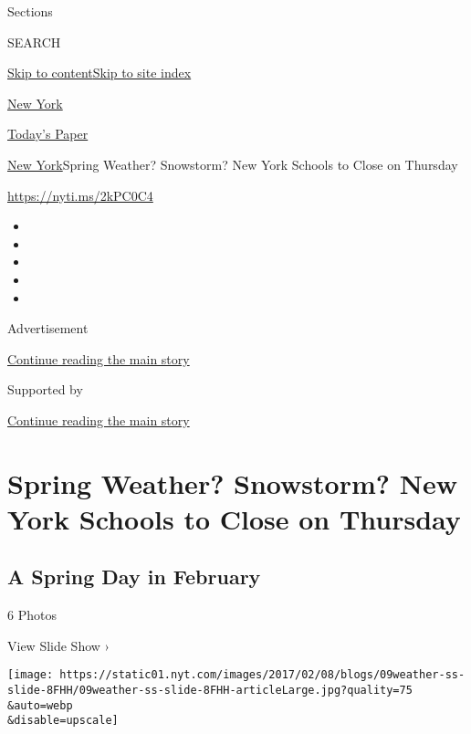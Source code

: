 Sections

SEARCH

\protect\hyperlink{site-content}{Skip to
content}\protect\hyperlink{site-index}{Skip to site index}

\href{https://www.nytimes.com/section/nyregion}{New York}

\href{https://myaccount.nytimes.com/auth/login?response_type=cookie\&client_id=vi}{}

\href{https://www.nytimes.com/section/todayspaper}{Today's Paper}

\href{/section/nyregion}{New York}\textbar{}Spring Weather? Snowstorm?
New York Schools to Close on Thursday

\url{https://nyti.ms/2kPC0C4}

\begin{itemize}
\item
\item
\item
\item
\item
\end{itemize}

Advertisement

\protect\hyperlink{after-top}{Continue reading the main story}

Supported by

\protect\hyperlink{after-sponsor}{Continue reading the main story}

\hypertarget{spring-weather-snowstorm-new-york-schools-to-close-on-thursday}{%
\section{Spring Weather? Snowstorm? New York Schools to Close on
Thursday}\label{spring-weather-snowstorm-new-york-schools-to-close-on-thursday}}

\href{https://www.nytimes.com/slideshow/2017/02/08/blogs/a-spring-day-in-february.html}{}

\hypertarget{a-spring-day-in-february}{%
\subsection{A Spring Day in February}\label{a-spring-day-in-february}}

6 Photos

View Slide Show ›

\texttt{[image: https://static01.nyt.com/images/2017/02/08/blogs/09weather-ss-slide-8FHH/09weather-ss-slide-8FHH-articleLarge.jpg?quality=75\\\&auto=webp\\\&disable=upscale]}

